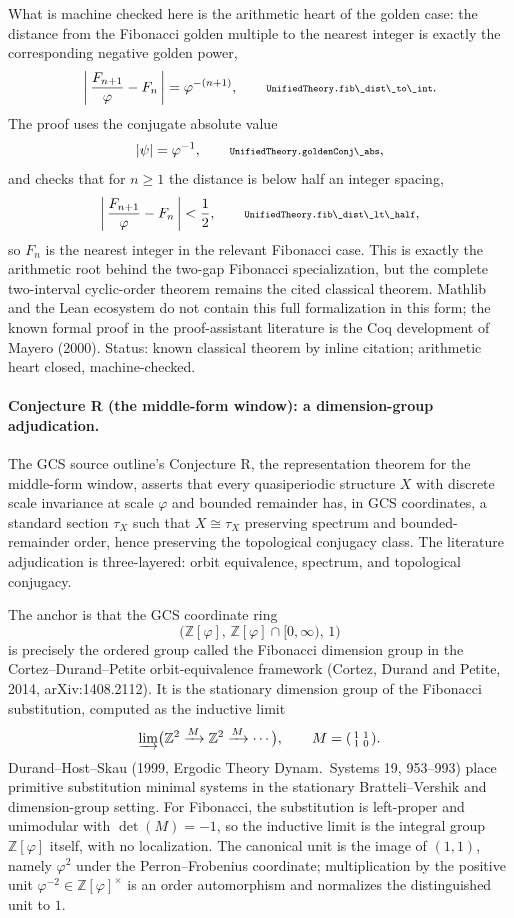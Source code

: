 \documentclass[11pt]{article}
\newcommand{\lean}[1]{\relax\ifmmode\hbox{\scriptsize\ttfamily\detokenize{#1}}\else{\small\texttt{\detokenize{#1}}}\fi}
\begin{document}
What is machine checked here is the arithmetic heart of the golden case: the distance from the Fibonacci golden multiple to the nearest integer is exactly the corresponding negative golden power,
$$
  \left|\,\frac{F_{n+1}}{\varphi}-F_n\,\right|
  =
  \varphi^{-(n+1)},
  \qquad
  \lean{UnifiedTheory.fib\_dist\_to\_int}.
$$
The proof uses the conjugate absolute value
$$
  |\psi|=\varphi^{-1},
  \qquad
  \lean{UnifiedTheory.goldenConj\_abs},
$$
and checks that for $n\ge1$ the distance is below half an integer spacing,
$$
  \left|\,\frac{F_{n+1}}{\varphi}-F_n\,\right|<\frac12,
  \qquad
  \lean{UnifiedTheory.fib\_dist\_lt\_half},
$$
so $F_n$ is the nearest integer in the relevant Fibonacci case.  This is exactly the arithmetic root behind the two-gap Fibonacci specialization, but the complete two-interval cyclic-order theorem remains the cited classical theorem.  Mathlib and the Lean ecosystem do not contain this full formalization in this form; the known formal proof in the proof-assistant literature is the Coq development of Mayero (2000).  Status: known classical theorem by inline citation; arithmetic heart closed, machine-checked.

\paragraph{Conjecture R (the middle-form window): a dimension-group adjudication.}
The GCS source outline's Conjecture R, the representation theorem for the middle-form window, asserts that every quasiperiodic structure $X$ with discrete scale invariance at scale $\varphi$ and bounded remainder has, in GCS coordinates, a standard section $\tau_X$ such that $X\cong\tau_X$ preserving spectrum and bounded-remainder order, hence preserving the topological conjugacy class.  The literature adjudication is three-layered: orbit equivalence, spectrum, and topological conjugacy.

The anchor is that the GCS coordinate ring
$$
  \bigl(\mathbb Z[\varphi],\,\mathbb Z[\varphi]\cap[0,\infty),\,1\bigr)
$$
is precisely the ordered group called the Fibonacci dimension group in the Cortez--Durand--Petite orbit-equivalence framework (Cortez, Durand and Petite, 2014, arXiv:1408.2112).  It is the stationary dimension group of the Fibonacci substitution, computed as the inductive limit
$$
  \varinjlim\bigl(\mathbb Z^2\xrightarrow{M}\mathbb Z^2\xrightarrow{M}\cdots\bigr),
  \qquad
  M=\begin{psmallmatrix}1&1\\1&0\end{psmallmatrix}.
$$
Durand--Host--Skau (1999, Ergodic Theory Dynam.\ Systems 19, 953--993) place primitive substitution minimal systems in the stationary Bratteli--Vershik and dimension-group setting.  For Fibonacci, the substitution is left-proper and unimodular with $\det(M)=-1$, so the inductive limit is the integral group $\mathbb Z[\varphi]$ itself, with no localization.  The canonical unit is the image of $(1,1)$, namely $\varphi^2$ under the Perron--Frobenius coordinate; multiplication by the positive unit $\varphi^{-2}\in\mathbb Z[\varphi]^\times$ is an order automorphism and normalizes the distinguished unit to $1$.
\end{document}

